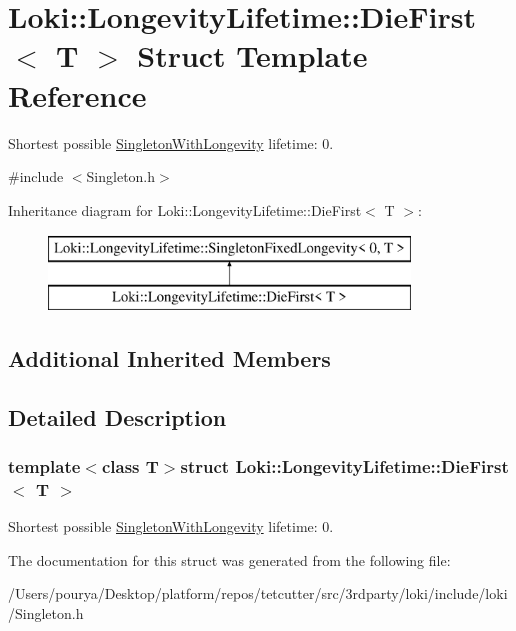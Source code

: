 \hypertarget{structLoki_1_1LongevityLifetime_1_1DieFirst}{}\section{Loki\+:\+:Longevity\+Lifetime\+:\+:Die\+First$<$ T $>$ Struct Template Reference}
\label{structLoki_1_1LongevityLifetime_1_1DieFirst}


Shortest possible \hyperlink{classLoki_1_1SingletonWithLongevity}{Singleton\+With\+Longevity} lifetime\+: 0.  




{\ttfamily \#include $<$Singleton.\+h$>$}

Inheritance diagram for Loki\+:\+:Longevity\+Lifetime\+:\+:Die\+First$<$ T $>$\+:\begin{figure}[H]
\begin{center}
\leavevmode
\includegraphics[height=2.000000cm]{structLoki_1_1LongevityLifetime_1_1DieFirst}
\end{center}
\end{figure}
\subsection*{Additional Inherited Members}


\subsection{Detailed Description}
\subsubsection*{template$<$class T$>$struct Loki\+::\+Longevity\+Lifetime\+::\+Die\+First$<$ T $>$}

Shortest possible \hyperlink{classLoki_1_1SingletonWithLongevity}{Singleton\+With\+Longevity} lifetime\+: 0. 

The documentation for this struct was generated from the following file\+:\begin{DoxyCompactItemize}
\item 
/\+Users/pourya/\+Desktop/platform/repos/tetcutter/src/3rdparty/loki/include/loki/Singleton.\+h\end{DoxyCompactItemize}
